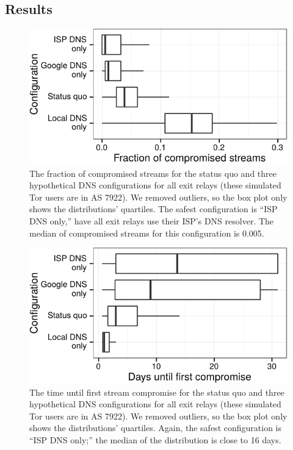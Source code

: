 \subsection{Results}

\begin{figure}[t]
\centering
\includegraphics[width=0.75\linewidth]{figures/differences-comp-streams.pdf}
\caption{The fraction of compromised streams for the status quo and three
hypothetical DNS configurations for all exit relays (these simulated Tor users 
are in AS 7922).  
We removed outliers, so 
the box plot only shows the distributions' quartiles.  The safest configuration
is ``ISP DNS only,'' \ie have all exit relays use their ISP's DNS resolver.  The
median of compromised streams for this configuration is 0.005.}
\label{fig:compromised-streams}
\end{figure}

\begin{figure}[t]
\centering
\includegraphics[width=0.75\linewidth]{figures/differences-time-comp.pdf}
\caption{The time until first stream compromise for the status quo and three
hypothetical DNS configurations for all exit relays (these simulated Tor users 
are in AS 7922).  
We removed outliers, so 
the box plot only shows the distributions' quartiles.  Again, the safest
configuration is ``ISP DNS only;'' the median of the distribution is
close to 16 days.}
\label{fig:time-until-compromise}
\end{figure}

